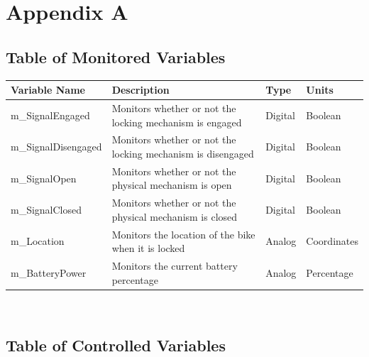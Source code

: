 \documentclass[12pt]{article}
\begin{document}
\newpage{}
\section{Appendix A}

\subsection{Table of Monitored Variables}

\begin{minipage}{\textwidth}
\renewcommand*{\arraystretch}{1.5}
\begin{tabular}{| p{} | p{} | p{} | p{} |}
 \hline
 Variable Name & Description & Type & Units \\ 
 \hline
 m\_SignalEngaged & Monitors whether or not the locking mechanism is engaged & Digital & Boolean \\ 
  \hline
 m\_SignalDisengaged & Monitors whether or not the locking mechanism is disengaged & Digital & Boolean \\ 
  \hline
 m\_SignalOpen & Monitors whether or not the physical mechanism is open & Digital & Boolean \\ 
  \hline
 m\_SignalClosed& Monitors whether or not the physical mechanism is closed & Digital & Boolean \\ 
  \hline
 m\_Location & Monitors the location of the bike when it is locked & Analog & Coordinates \\ 
  \hline
 m\_BatteryPower & Monitors the current battery percentage & Analog & Percentage \\ 
 \hline
\end{tabular}
\end{minipage}\\

\subsection{Table of Controlled Variables}
\end{document}
